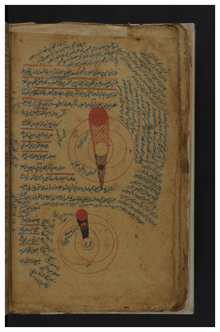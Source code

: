 \begin{figure}[]
\begin{subfigure}[b]{.475\columnwidth}
		\includegraphics[height=0.45\textheight]{diagrams.jpg}
	\end{subfigure}
	\hfill
	\begin{subfigure}[b]{.475\columnwidth}
		\centering

\end{subfigure}
\end{figure}
